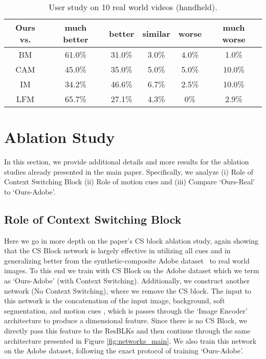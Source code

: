 \documentclass[10pt,twocolumn,letterpaper]{article}
\begin{document}
\begin{table}[!h]
\setlength\tabcolsep{2pt}
	\centering
	\small
	\captionsetup{justification=centering}
\begin{tabular}{c|ccccc}
			\toprule
			 Ours vs. &  much better & better & similar & worse & much worse \\ 
			 \midrule
			 BM & 61.0\% & 31.0\% & 3.0\% & 4.0\% & 1.0\% \\
			 CAM & 45.0\% & 35.0\% & 5.0\% & 5.0\% & 10.0\%\\
			 IM & 34.2\% & 46.6\% & 6.7\% & 2.5\% & 10.0\%\\
			 LFM & 65.7\% & 27.1\% & 4.3\% & 0\% & 2.9\%\\
			\bottomrule
		\end{tabular}
		\vspace{0.5em}
		\caption{\small User study on 10 real world videos (handheld).}
\label{tab:real-hand1}
\end{table}



\section{Ablation Study}
\label{sec:abla_sup}


In this section, we provide additional details and more results for the ablation studies already presented in the main paper. Specifically, we analyze (i) Role of Context Switching Block (ii) Role of motion cues and (iii) Compare `Ours-Real' to `Ours-Adobe'.

\subsection{Role of Context Switching Block}
\label{sec:cs_block}
Here we go in more depth on the paper's CS block ablation study, again showing that the CS Block network is largely effective in utilizing all cues and in generalizing better from the synthetic-composite Adobe dataset~\cite{xu2017deep} to real world images. To this end we train  with CS Block on the Adobe dataset which we term as `Ours-Adobe' (with Context Switching). Additionally, we construct another network  (No Context Switching), where we remove the CS block. The input to this network is the concatenation of the input image, background, soft segmentation, and motion cues  , which is passes through the `Image Encoder' architecture to produce a  dimensional feature. Since there is no CS  Block, we directly pass this feature to the ResBLKs and then continue through the same architecture presented in Figure \ref{fig:networks_main}. We also train this network on the Adobe dataset, following the exact protocol of training `Ours-Adobe'.
\end{document}
